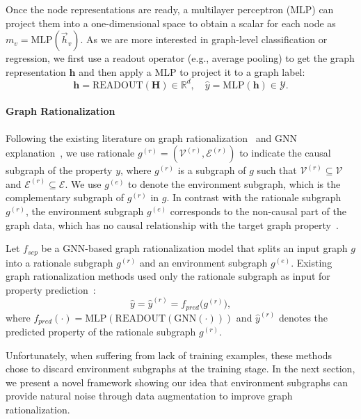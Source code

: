 \documentclass[sigconf]{acmart}
\begin{document}
Once the node representations are ready, a multilayer perceptron (MLP) can project them into a one-dimensional space to obtain a scalar for each node as $m_v = \text{MLP}(\vec{h}_v).$
As we are more interested in graph-level classification or regression, we first use a readout operator (e.g., average pooling) to get the graph representation $\mathbf{h}$ and then apply a MLP to project it to a graph label:
\begin{equation}
\label{eq:readout_and_mlp_g}
    \mathbf{h} = \text{READOUT}(\mathbf{H}) \in \mathbb{R}^{d}, \quad \hat{y} = \text{MLP}(\mathbf{h}) \in \mathcal{Y}.
\end{equation}


\paragraph{Graph Rationalization}
Following the existing literature on graph rationalization~\cite{ying2018hierarchical,lee2019self,gao2021graph,fan2021generalizing,wu2022discovering} and GNN explanation~\cite{ying2019gnnexplainer}, we use rationale $g^{(r)} = (\mathcal{V}^{(r)}, \mathcal{E}^{(r)})$ to indicate the causal subgraph of the property $y$, where $g^{(r)}$ is a subgraph of $g$ such that $\mathcal{V}^{(r)} \subseteq \mathcal{V}$ and $\mathcal{E}^{(r)} \subseteq \mathcal{E}$. We use $g^{(e)}$ to denote the environment subgraph, which is the complementary subgraph of $g^{(r)}$ in $g$.
In contrast with the rationale subgraph $g^{(r)}$, the environment subgraph $g^{(e)}$ corresponds to the non-causal part of the graph data, which has no causal relationship with the target graph property~\cite{chang2020invariant,wu2022discovering}.

Let $f_{sep}$ be a GNN-based graph rationalization model that splits an input graph $g$ into a rationale subgraph $g^{(r)}$ and an environment subgraph $g^{(e)}$. Existing graph rationalization methods used only the rationale subgraph as input for property prediction~\cite{lee2019self,ying2018hierarchical,gao2021graph,wu2022discovering}:
\begin{equation}
\label{eq:f_pred}
    \hat{y} = \hat{y}^{(r)} = f_{pred} \big(g^{(r)}\big),
\end{equation}
where $f_{pred}(\cdot) = \text{MLP}(\text{READOUT}(\text{GNN}(\cdot)))$ and $\hat{y}^{(r)}$ denotes the predicted property of the rationale subgraph $g^{(r)}$.

Unfortunately, when suffering from lack of training examples, these methods chose to discard environment subgraphs at the training stage. 
In the next section, we present a novel framework showing our idea that environment subgraphs can provide natural noise through data augmentation to improve graph rationalization.
%
 
\end{document}
